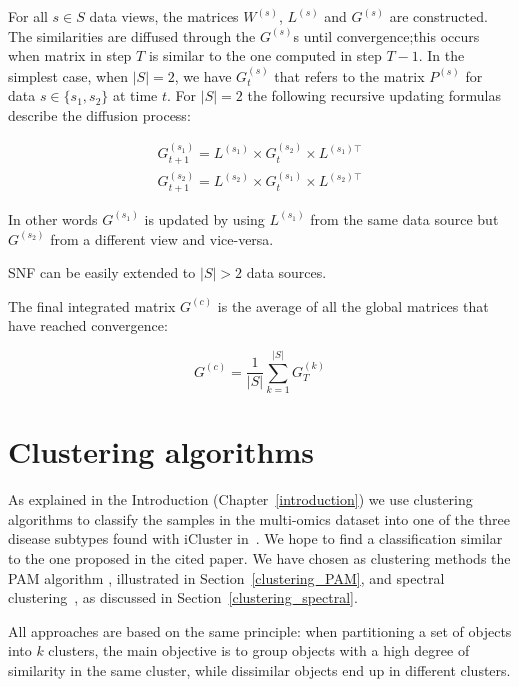 For all $s\in S$ data views, the matrices $W^{(s)}$, $L^{(s)}$ and $G^{(s)}$ are constructed. The similarities are diffused through the $G^{(s)}$s until convergence;this occurs when matrix in step $T$ is similar to the one computed in step $T-1$.  
In the simplest case, when $|S|=2$, we have $G_t^{(s)}$ that refers to the matrix $P^{(s)}$ for data $s \in \{ s_1,s_2\}$ at time $t$.
For $|S|=2$ the following recursive updating formulas describe the diffusion process:

\begin{equation*}
    \begin{gathered}
        G^{(s_1)}_{t+1}=L^{(s_1)} \times G^{(s_2)}_{t} \times L^{(s_1)\top} \\
        G^{(s_2)}_{t+1}=L^{(s_2)} \times G^{(s_1)}_{t} \times L^{(s_2)\top}  
    \end{gathered}
\end{equation*}

In other words $G^{(s_1)}$ is updated by using $L^{(s_1)}$ from the same data source but $G^{(s_2)}$ from a different view and vice-versa.

SNF can be easily extended to $|S|>2$ data sources. \newline


The final integrated matrix $G^{(c)}$ is the average of all the global matrices that have reached convergence:

\begin{equation*}
    G^{(c)} = \frac{1}{|S|} \sum_{k=1}^{|S|} G_T^{(k)}
\end{equation*}


\section{Clustering algorithms}\label{methods_clustering}
As explained in the Introduction (Chapter~\ref{introduction}) we use clustering algorithms to classify the samples in the multi-omics dataset into one of the three disease subtypes found with iCluster in~\cite{shen2009integrative}. We hope to find a classification similar to the one proposed in the cited paper. We have chosen as clustering methods the PAM algorithm%
, illustrated in Section~\ref{clustering_PAM}, and spectral clustering~\cite{von2007SP}, as discussed in Section~\ref{clustering_spectral}.

All approaches are based on the same principle: when partitioning a set of objects into $k$ clusters, the main objective is to group objects with a high degree of similarity in the same cluster, while dissimilar objects end up in different clusters.

